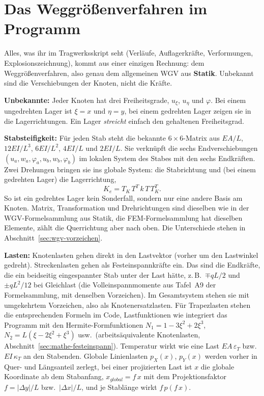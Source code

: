 \section{Das Weggrößenverfahren im Programm}\label{sec:mathe-wgv}

Alles, was ihr im Tragwerksskript seht (Verläufe, Auflagerkräfte, Verformungen,
Explosionszeichnung), kommt aus einer einzigen Rechnung: dem Weggrößenverfahren, also genau dem
allgemeinen WGV aus \textbf{Statik}. Unbekannt sind die Verschiebungen der Knoten, nicht die
Kräfte.

\textbf{Unbekannte:} Jeder Knoten hat drei Freiheitsgrade, $u_\xi$, $u_\eta$ und $\varphi$. Bei
einem ungedrehten Lager ist $\xi = x$ und $\eta = y$, bei einem gedrehten Lager zeigen sie in die
Lagerrichtungen. Ein Lager \emph{streicht} einfach den gehaltenen Freiheitsgrad.

\textbf{Stabsteifigkeit:} Für jeden Stab steht die bekannte $6 \times 6$-Matrix aus $EA/L$,
$12EI/L^3$, $6EI/L^2$, $4EI/L$ und $2EI/L$. Sie verknüpft die sechs Endverschiebungen
$(u_a, w_a, \varphi_a, u_b, w_b, \varphi_b)$ im lokalen System des Stabes mit den sechs
Endkräften. Zwei Drehungen bringen sie ins globale System: die Stabrichtung und (bei einem
gedrehten Lager) die Lagerrichtung,
\[
  K_e = T_K\,T^T\,k\,T\,T_K^T .
\]
So ist ein gedrehtes Lager kein Sonderfall, sondern nur eine andere Basis am Knoten. Matrix,
Transformation und Drehrichtungen sind dieselben wie in der WGV-Formelsammlung aus Statik, die
FEM-Formelsammlung hat dieselben Elemente, zählt die Querrichtung aber nach oben. Die
Unterschiede stehen in Abschnitt~\ref{sec:wgv-vorzeichen}.

\textbf{Lasten:} Knotenlasten gehen direkt in den Lastvektor (vorher um den Lastwinkel gedreht).
Streckenlasten gehen als Festeinspannkräfte ein. Das sind die Endkräfte, die ein
beidseitig eingespannter Stab unter der Last hätte, z.\,B.\ $\mp qL/2$ und $\pm qL^2/12$ bei
Gleichlast (die Volleinspannmomente aus Tafel~A9 der Formelsammlung, mit denselben Vorzeichen).
Im Gesamtsystem stehen sie mit umgekehrtem Vorzeichen, also als Knotenersatzlasten. Für Trapezlasten stehen die entsprechenden Formeln im Code, Lastfunktionen wie
 integriert das Programm mit den Hermite-Formfunktionen
$N_1 = 1 - 3\xi^2 + 2\xi^3$, $N_2 = L(\xi - 2\xi^2 + \xi^3)$ usw.\ (arbeitsäquivalente
Knotenlasten, Abschnitt~\ref{sec:mathe-festeinspann}). Temperatur wirkt wie eine Last $EA\,\varepsilon_T$ bzw.\ $EI\,\kappa_T$ an den
Stabenden. Globale Linienlasten $p_X(x)$, $p_Y(x)$ werden vorher in Quer- und Längsanteil zerlegt,
bei einer projizierten Last ist $x$ die globale Koordinate ab dem Stabanfang, $x_{global} = f\,x$
mit dem Projektionsfaktor $f = |\Delta y|/L$ bzw.\ $|\Delta x|/L$, und je Stablänge wirkt
$f\,p(f\,x)$.

